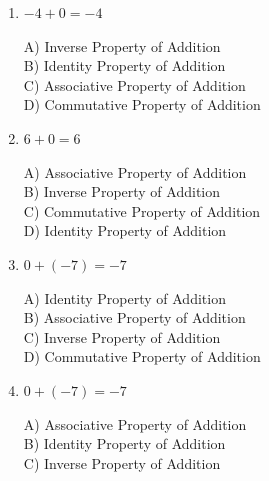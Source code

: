 \documentclass[11pt]{article}
\begin{document}
\begin{enumerate}
\\[2pt]
\begin{minipage}{\linewidth}
A) Commutative Property of Multiplication \\
B) Associative Property of Multiplication \\
C) Identity Property of Multiplication \\
D) Inverse Property of Multiplication
\end{minipage}
  \vspace{0.3cm}
  \item $-4 + 0 = -4$
\\[2pt]
\begin{minipage}{\linewidth}
A) Inverse Property of Addition \\
B) Identity Property of Addition \\
C) Associative Property of Addition \\
D) Commutative Property of Addition
\end{minipage}
  \vspace{0.3cm}
  \item $6 + 0 = 6$
\\[2pt]
\begin{minipage}{\linewidth}
A) Associative Property of Addition \\
B) Inverse Property of Addition \\
C) Commutative Property of Addition \\
D) Identity Property of Addition
\end{minipage}
  \vspace{0.3cm}
  \item $0 + (-7) = -7$
\\[2pt]
\begin{minipage}{\linewidth}
A) Identity Property of Addition \\
B) Associative Property of Addition \\
C) Inverse Property of Addition \\
D) Commutative Property of Addition
\end{minipage}
  \vspace{0.3cm}
  \item $0 + (-7) = -7$
\\[2pt]
\begin{minipage}{\linewidth}
A) Associative Property of Addition \\
B) Identity Property of Addition \\
C) Inverse Property of Addition \\

\end{minipage}
\end{enumerate}
\end{document}
